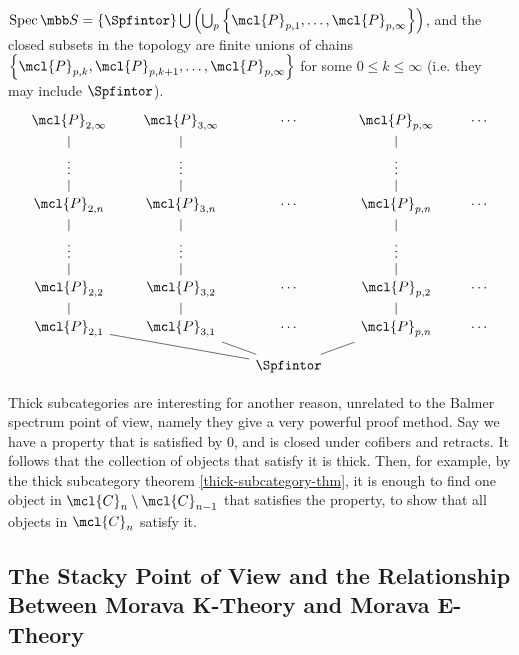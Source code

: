 \begin{theorem}
	$
	\spec \SS
	= \left\{\Spfintor\right\}
	\bigcup \left(\bigcup_p \left\{\mcl{P}_{p, 1}, \dotsc, \mcl{P}_{p, \infty}\right\}\right)
	$,
	and the closed subsets in the topology are finite unions of chains
	$\left\{ \mcl{P}_{p, k}, \mcl{P}_{p, k+1}, \dotsc, \mcl{P}_{p, \infty} \right\}$
	for some $0 \leq k \leq \infty$ (i.e. they may include $\Spfintor$).
	$$
	\begin{tikzcd}[row sep=small, column sep=scriptsize]	
		\mcl{P}_{2, \infty} & \mcl{P}_{3, \infty} & \cdots & \mcl{P}_{p, \infty} & \cdots\\
		\vdots \arrow[dash]{u}{} & \vdots \arrow[dash]{u}{} &  & \vdots \arrow[dash]{u}{} & \\
		\mcl{P}_{2, n} \arrow[dash]{u}{} & \mcl{P}_{3, n} \arrow[dash]{u}{} & \cdots & \mcl{P}_{p, n} \arrow[dash]{u}{} & \cdots\\
		\vdots \arrow[dash]{u}{} & \vdots \arrow[dash]{u}{} &  & \vdots \arrow[dash]{u}{} & \\
		\mcl{P}_{2, 2} \arrow[dash]{u}{} & \mcl{P}_{3, 2} \arrow[dash]{u}{} & \cdots & \mcl{P}_{p, 2} \arrow[dash]{u}{} & \cdots\\
		\mcl{P}_{2, 1} \arrow[dash]{u}{} & \mcl{P}_{3, 1} \arrow[dash]{u}{} & \cdots & \mcl{P}_{p, n} \arrow[dash]{u}{} & \cdots\\
		& & \Spfintor \arrow[dash]{ull}{} \arrow[dash]{ul}{} \arrow[dash]{ur}{}
	\end{tikzcd}
	$$
\end{theorem}

\begin{remark}
	Thick subcategories are interesting for another reason, unrelated to the Balmer spectrum point of view, namely they give a very powerful proof method.
	Say we have a property that is satisfied by $0$, and is closed under cofibers and retracts.
	It follows that the collection of objects that satisfy it is thick.
	Then, for example, by the thick subcategory theorem \ref{thick-subcategory-thm}, it is enough to find one object in $\mcl{C}_n \setminus \mcl{C}_{n-1}$ that satisfies the property, to show that all objects in $\mcl{C}_n$ satisfy it.
\end{remark}



\subsection{The Stacky Point of View and the Relationship Between Morava K-Theory and Morava E-Theory}

